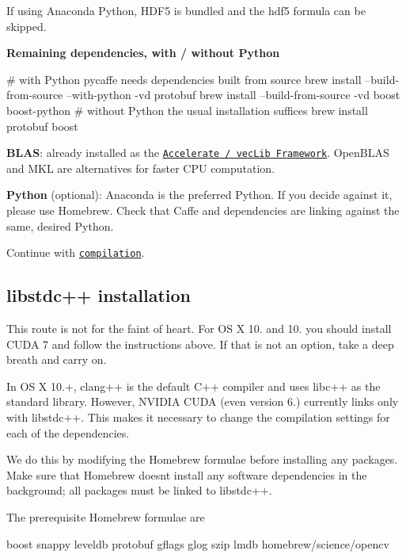 If using Anaconda Python, H\+D\+F5 is bundled and the {\ttfamily hdf5} formula can be skipped.

{\bfseries Remaining dependencies, with / without Python} \begin{DoxyVerb}# with Python pycaffe needs dependencies built from source
brew install --build-from-source --with-python -vd protobuf
brew install --build-from-source -vd boost boost-python
# without Python the usual installation suffices
brew install protobuf boost
\end{DoxyVerb}


{\bfseries B\+L\+AS}\+: already installed as the \href{https://developer.apple.com/library/mac/documentation/Darwin/Reference/ManPages/man7/Accelerate.7.html}{\tt Accelerate / vec\+Lib Framework}. Open\+B\+L\+AS and M\+KL are alternatives for faster C\+PU computation.

{\bfseries Python} (optional)\+: Anaconda is the preferred Python. If you decide against it, please use Homebrew. Check that Caffe and dependencies are linking against the same, desired Python.

Continue with \href{installation.html#compilation}{\tt compilation}.

\subsection*{libstdc++ installation}

This route is not for the faint of heart. For OS X 10. and 10. you should install C\+U\+DA 7 and follow the instructions above. If that is not an option, take a deep breath and carry on.

In OS X 10.+, clang++ is the default C++ compiler and uses {\ttfamily libc++} as the standard library. However, N\+V\+I\+D\+IA C\+U\+DA (even version 6.) currently links only with {\ttfamily libstdc++}. This makes it necessary to change the compilation settings for each of the dependencies.

We do this by modifying the Homebrew formulae before installing any packages. Make sure that Homebrew doesn\textquotesingle{}t install any software dependencies in the background; all packages must be linked to {\ttfamily libstdc++}.

The prerequisite Homebrew formulae are \begin{DoxyVerb}boost snappy leveldb protobuf gflags glog szip lmdb homebrew/science/opencv
\end{DoxyVerb}


